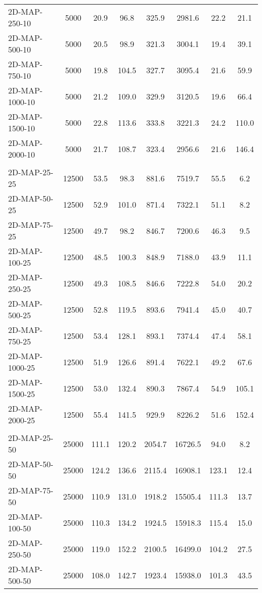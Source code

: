 \documentclass{article}
\begin{document}
\begin{center}
\begin{table}[h]
\begin{tabular}{|l||c|c|c|c|c|c|c|}
    2D-MAP-250-10 & 5000 & 20.9 & 96.8 & 325.9 & 2981.6 & 22.2 & 21.1 \\
    2D-MAP-500-10 & 5000 & 20.5 & 98.9 & 321.3 & 3004.1 & 19.4 & 39.1 \\
    2D-MAP-750-10 & 5000 & 19.8 & 104.5 & 327.7 & 3095.4 & 21.6 & 59.9 \\
    2D-MAP-1000-10 & 5000 & 21.2 & 109.0 & 329.9 & 3120.5 & 19.6 & 66.4 \\
    2D-MAP-1500-10 & 5000 & 22.8 & 113.6 & 333.8 & 3221.3 & 24.2 & 110.0 \\
    2D-MAP-2000-10 & 5000 & 21.7 & 108.7 & 323.4 & 2956.6 & 21.6 & 146.4 \\
    \hline \\
    2D-MAP-25-25 & 12500 & 53.5 & 98.3 & 881.6 & 7519.7 & 55.5 & 6.2 \\
    2D-MAP-50-25 & 12500 & 52.9 & 101.0 & 871.4 & 7322.1 & 51.1 & 8.2 \\
    2D-MAP-75-25 & 12500 & 49.7 & 98.2 & 846.7 & 7200.6 & 46.3 & 9.5 \\
    2D-MAP-100-25 & 12500 & 48.5 & 100.3 & 848.9 & 7188.0 & 43.9 & 11.1 \\
    2D-MAP-250-25 & 12500 & 49.3 & 108.5 & 846.6 & 7222.8 & 54.0 & 20.2 \\
    2D-MAP-500-25 & 12500 & 52.8 & 119.5 & 893.6 & 7941.4 & 45.0 & 40.7 \\
    2D-MAP-750-25 & 12500 & 53.4 & 128.1 & 893.1 & 7374.4 & 47.4 & 58.1 \\
    2D-MAP-1000-25 & 12500 & 51.9 & 126.6 & 891.4 & 7622.1 & 49.2 & 67.6 \\
    2D-MAP-1500-25 & 12500 & 53.0 & 132.4 & 890.3 & 7867.4 & 54.9 & 105.1 \\
    2D-MAP-2000-25 & 12500 & 55.4 & 141.5 & 929.9 & 8226.2 & 51.6 & 152.4 \\
    \hline \\
    2D-MAP-25-50 & 25000 & 111.1 & 120.2 & 2054.7 & 16726.5 & 94.0 & 8.2 \\
    2D-MAP-50-50 & 25000 & 124.2 & 136.6 & 2115.4 & 16908.1 & 123.1 & 12.4 \\
    2D-MAP-75-50 & 25000 & 110.9 & 131.0 & 1918.2 & 15505.4 & 111.3 & 13.7 \\
    2D-MAP-100-50 & 25000 & 110.3 & 134.2 & 1924.5 & 15918.3 & 115.4 & 15.0 \\
    2D-MAP-250-50 & 25000 & 119.0 & 152.2 & 2100.5 & 16499.0 & 104.2 & 27.5 \\
    2D-MAP-500-50 & 25000 & 108.0 & 142.7 & 1923.4 & 15938.0 & 101.3 & 43.5 \\

\end{tabular}
\end{table}
\end{center}
\end{document}
